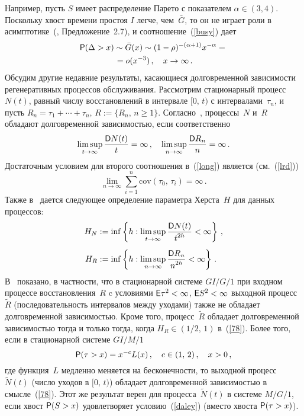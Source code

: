 \begin{multicols}{2}
\noindent
Например, пусть $S$ имеет распределение Парето с показателем $\alpha \in (3,4)$.
Поскольку хвост времени простоя $I$ легче, чем~$\bar G$, то он не играет роли в асимптотике~(\cite {Sigman},
Предложение~2.7), и соотношение~(\ref{busy}) дает
\begin{multline*}
{\sf P}(\Delta>x)\sim \bar G(x)\sim (1-\rho)^{-(\alpha+1)} x^{-\alpha} = {}\\
{}= o(x^{-3})\,,\quad x\to \infty\,.
\end{multline*}
Обсудим другие недавние результаты, каса\-ющие\-ся долговременной
зависимости регенеративных процессов обслуживания. Рассмотрим
стационарный процесс~$N(t)$, равный числу восстановлений в интервале
$[0,\,t)$ с интервалами~$\tau_n$, и пусть
$R_n=\tau_1+\cdots+\tau_n,\,R:=\{R_n,\,n\ge1\}$. Согласно~\cite {Daley-Vesilo}, процессы~$N$ и~$R$ обладают
долговременной зависимостью, если соответственно
\begin{equation}
\limsup_{t\to \infty}\displaystyle\frac{\displaystyle {\sf D} N(t)\mathstrut}{\displaystyle t\mathstrut}=\infty\,,\quad
\limsup_{n\to \infty}\displaystyle\frac{\displaystyle {\sf D} R_n\mathstrut}{\displaystyle n\mathstrut}=\infty\,.
\label{long}
\end{equation}
Достаточным условием для второго соотношения в~(\ref{long}) является
 (см.~(\ref{lrd}))
$$
\lim_{n\to \infty}\sum\limits_{i=1}^n \mathrm{cov} (\tau_0,\,\tau_i)=\infty\,.
$$
Также в~\cite{Daley-Vesilo} дается следующее определение параметра Херста~$H$ для
данных процессов:
\begin{align}
H_N&:=\inf \left\{h: \limsup_{t\to \infty}\displaystyle\frac{\displaystyle {\sf D} N(t)\mathstrut}{\displaystyle t^{2h}\mathstrut}<\infty\right\}\,,\notag\\[-6pt]
&\label{78}\\[-6pt]
H_R&:=\inf \left\{h: \limsup_{n\to \infty}\displaystyle\frac{\displaystyle {\sf D} R_n\mathstrut}{\displaystyle n^{2h}\mathstrut}<\infty\right\}\,.\notag
\end{align}
В~\cite {Daley-Vesilo} показано, в частности, что в стационарной
системе $GI/G/1$ при входном процессе восста\-нов\-ления~$R$ c
условиями ${\sf E} \tau^2<\infty$, ${\sf E} S^2<\infty$ выходной процесс~$\tilde R$
(последовательность интервалов между уходами)
также не обладает долговременной зависимостью. Кроме того, процесс~$\tilde R$ обладает долговременной
зависимостью тогда и только тогда, когда $H_R\in (1/2,\,1)$ в~(\ref{78}).
Более того, если в стационарной сис\-те\-ме $GI/M/1$
\begin{equation}
{\sf P}(\tau>x)=x^{-c} L(x)\,,\quad c\in (1,\,2)\,,\quad x>0\,,
\label{daley}
\end{equation}
где функция~$L$ медленно меняется на бесконечности, то выходной
процесс $\tilde N(t)$ (число уходов в $[0,\,t)$) обладает
долговременной зависимостью в смысле~(\ref{78}). Этот же результат
верен для процесса~$\tilde N(t)$
в сис\-те\-ме $M/G/1$, если хвост $ {\sf P}(S>x)$ удов\-ле\-тво\-ряет условию~(\ref{daley}) (вместо хвоста ${\sf P}(\tau>x)$).


\end{multicols}
